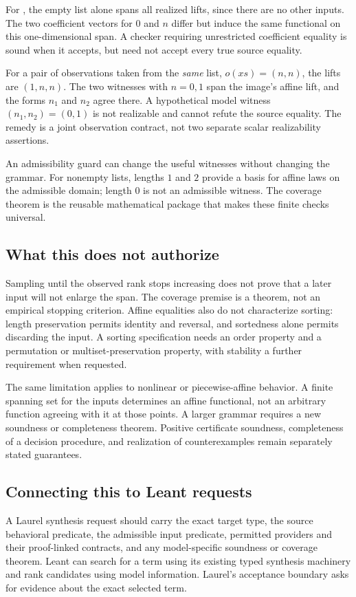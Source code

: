 \documentclass[11pt,a4paper]{article}
\newcommand{\code}[1]{\texttt{\detokenize{#1}}}
\theoremstyle{definition}
\theoremstyle{remark}
\begin{document}
For \code{List Empty}, the empty list alone spans all realized lifts, since there are no other inputs. The two coefficient vectors for $0$ and $n$ differ but induce the same functional on this one-dimensional span. A checker requiring unrestricted coefficient equality is sound when it accepts, but need not accept every true source equality.

For a pair of observations taken from the \emph{same} list, $o(xs)=(n,n)$, the lifts are $(1,n,n)$. The two witnesses with $n=0,1$ span the image's affine lift, and the forms $n_1$ and $n_2$ agree there. A hypothetical model witness $(n_1,n_2)=(0,1)$ is not realizable and cannot refute the source equality. The remedy is a joint observation contract, not two separate scalar realizability assertions.

An admissibility guard can change the useful witnesses without changing the grammar. For nonempty lists, lengths $1$ and $2$ provide a basis for affine laws on the admissible domain; length $0$ is not an admissible witness. The coverage theorem is the reusable mathematical package that makes these finite checks universal.

\subsection{What this does not authorize}
Sampling until the observed rank stops increasing does not prove that a later input will not enlarge the span. The coverage premise is a theorem, not an empirical stopping criterion. Affine equalities also do not characterize sorting: length preservation permits identity and reversal, and sortedness alone permits discarding the input. A sorting specification needs an order property and a permutation or multiset-preservation property, with stability a further requirement when requested.

The same limitation applies to nonlinear or piecewise-affine behavior. A finite spanning set for the inputs determines an affine functional, not an arbitrary function agreeing with it at those points. A larger grammar requires a new soundness or completeness theorem. Positive certificate soundness, completeness of a decision procedure, and realization of counterexamples remain separately stated guarantees.

\subsection{Connecting this to Leant requests}
A Laurel synthesis request should carry the exact target type, the source behavioral predicate, the admissible input predicate, permitted providers and their proof-linked contracts, and any model-specific soundness or coverage theorem. Leant can search for a term using its existing typed synthesis machinery and rank candidates using model information. Laurel's acceptance boundary asks for evidence about the exact selected term.
\end{document}
